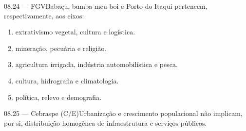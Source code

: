 \begin{questao}{ 08.24 — FGV}Babaçu, bumba-meu-boi e Porto do Itaqui pertencem, respectivamente, aos eixos:\begin{enumerate}[label=\Alph*)]\item extrativismo vegetal, cultura e logística.\item mineração, pecuária e religião.\item agricultura irrigada, indústria automobilística e pesca.\item cultura, hidrografia e climatologia.\item política, relevo e demografia.\end{enumerate}\end{questao}
\begin{questao}{ 08.25 — Cebraspe (C/E)}Urbanização e crescimento populacional não implicam, por si, distribuição homogênea de infraestrutura e serviços públicos.\end{questao}

